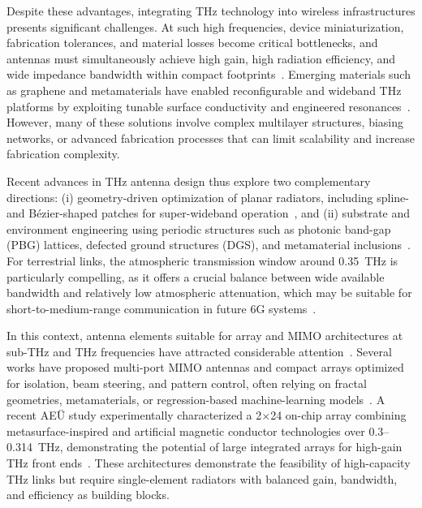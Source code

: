 \documentclass[a4paper,fleqn]{cas-dc}
\begin{document}
Despite these advantages, integrating THz technology into wireless infrastructures presents significant challenges. At such high frequencies, device miniaturization, fabrication tolerances, and material losses become critical bottlenecks, and antennas must simultaneously achieve high gain, high radiation efficiency, and wide impedance bandwidth within compact footprints~\cite{ullah_thz_2019}. Emerging materials such as graphene and metamaterials have enabled reconfigurable and wideband THz platforms by exploiting tunable surface conductivity and engineered resonances~\cite{moradi_graphene_2021,krishna_graphene_2023}. However, many of these solutions involve complex multilayer structures, biasing networks, or advanced fabrication processes that can limit scalability and increase fabrication complexity.

Recent advances in THz antenna design thus explore two complementary directions: (i) geometry-driven optimization of planar radiators, including spline- and Bézier-shaped patches for super-wideband operation~\cite{marouf_bezier_2023}, and (ii) substrate and environment engineering using periodic structures such as photonic band-gap (PBG) lattices, defected ground structures (DGS), and metamaterial inclusions~\cite{khezzar_pbg_2021,ullah_thz_2019,temmar_bspo_2019,devapriya_metamaterial_2019}. For terrestrial links, the atmospheric transmission window around 0.35~THz is particularly compelling, as it offers a crucial balance between wide available bandwidth and relatively low atmospheric attenuation, which may be suitable for short-to-medium-range communication in future 6G systems~\cite{strinati_6g_2019,khezzar_pbg_2021}.

In this context, antenna elements suitable for array and MIMO architectures at sub-THz and THz frequencies have attracted considerable attention~\cite{mousa_ebg_2026,li_triband_2024,nirob_grid_2025}. Several works have proposed multi-port MIMO antennas and compact arrays optimized for isolation, beam steering, and pattern control, often relying on fractal geometries, metamaterials, or regression-based machine-learning models~\cite{panda_fractal_2025,devapriya_metamaterial_2019,krishna_rhombus_2021}. A recent AEÜ study experimentally characterized a 2$\times$24 on-chip array combining metasurface-inspired and artificial magnetic conductor technologies over 0.3--0.314~THz, demonstrating the potential of large integrated arrays for high-gain THz front ends~\cite{alibakhshikenari_thz_array_2023}. These architectures demonstrate the feasibility of high-capacity THz links but require single-element radiators with balanced gain, bandwidth, and efficiency as building blocks.
\end{document}

